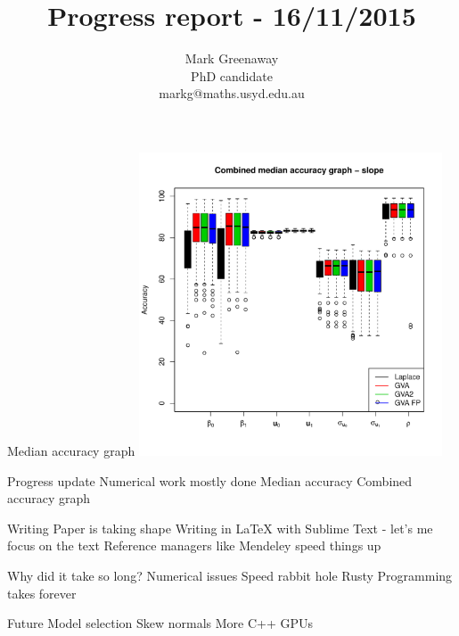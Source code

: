 \documentclass{beamer}
\title{Progress report - 16/11/2015}
\author{Mark Greenaway\\PhD candidate\\markg@maths.usyd.edu.au}
\begin{document}
\begin{frame}
\maketitle
\end{frame}

\begin{frame}{Median accuracy graph}
\includegraphics[width=90mm, height=90mm]{code/results/median_accuracy_combined_slope.pdf}
\end{frame}

Progress update
Numerical work mostly done
	Median accuracy
	Combined accuracy graph

Writing
	Paper is taking shape
	Writing in LaTeX with Sublime Text - let's me focus on the text
	Reference managers like Mendeley speed things up

Why did it take so long?
	Numerical issues
	Speed rabbit hole
	Rusty
	Programming takes forever

Future
	Model selection
	Skew normals
	More C++
	GPUs
\end{document}
